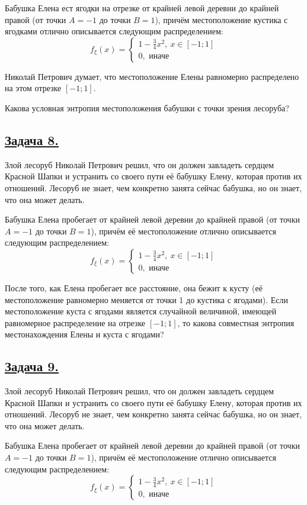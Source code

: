 Бабушка Елена ест ягодки на отрезке от крайней левой деревни до крайней правой (от точки $A=-1$ до точки $B=1$), причём местоположение кустика с ягодками отлично описывается следующим распределением:\[f_{\xi}(x)=\begin{cases}
    1-\frac{3}{4}x^2, \ x\in [-1; 1] \\
    0, \text{ иначе}
\end{cases} \]

Николай Петрович думает, что местоположение Елены равномерно распределено на этом отрезке $[-1;1]$.

Какова условная энтропия местоположения бабушки с точки зрения лесоруба?

\subsection*{\hyperref[sec:sol_problem8]{Задача 8.}}\label{sec:problem8} Злой лесоруб Николай Петрович решил, что он должен завладеть сердцем Красной Шапки и устранить со своего пути её бабушку Елену, которая против их отношений. Лесоруб не знает, чем конкретно занята сейчас бабушка, но он знает, что она может делать.

Бабушка Елена пробегает от крайней левой деревни до крайней правой (от точки $A=-1$ до точки $B=1$), причём её местоположение отлично описывается следующим распределением:\[f_{\xi}(x)=\begin{cases}
    1-\frac{3}{4}x^2, \ x\in [-1; 1] \\
    0, \text{ иначе}
\end{cases} \]

После того, как Елена пробегает все расстояние, она бежит к кусту (её местоположение равномерно меняется от точки 1 до кустика с ягодами). Если местоположение куста с ягодами является случайной величиной, имеющей равномерное распределение на отрезке $[-1; 1]$, то какова совместная энтропия местонахождения Елены и куста с ягодами?

\subsection*{\hyperref[sec:sol_problem9]{Задача 9.}}\label{sec:problem9} Злой лесоруб Николай Петрович решил, что он должен завладеть сердцем Красной Шапки и устранить со своего пути её бабушку Елену, которая против их отношений. Лесоруб не знает, чем конкретно занята сейчас бабушка, но он знает, что она может делать.

Бабушка Елена пробегает от крайней левой деревни до крайней правой (от точки $A=-1$ до точки $B=1$), причём её местоположение отлично описывается следующим распределением:\[f_{\xi}(x)=\begin{cases}
    1-\frac{3}{4}x^2, \ x\in [-1; 1] \\
    0, \text{ иначе}
\end{cases} \]

